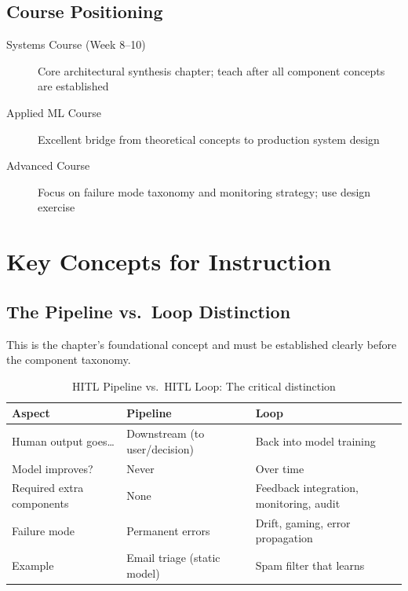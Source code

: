 \subsection{Course Positioning}
\begin{description}
    \item[Systems Course (Week 8--10)] Core architectural synthesis chapter; teach after all component concepts are established
    \item[Applied ML Course] Excellent bridge from theoretical concepts to production system design
    \item[Advanced Course] Focus on failure mode taxonomy and monitoring strategy; use design exercise
\end{description}

\section{Key Concepts for Instruction}

\subsection{The Pipeline vs.\ Loop Distinction}

This is the chapter's foundational concept and must be established clearly before the component taxonomy.

\begin{table}[htbp]
\caption{HITL Pipeline vs.\ HITL Loop: The critical distinction}
\label{tab:pipeline-vs-loop}
\centering
\begin{tabular}{@{}p{3.5cm}p{4cm}p{4cm}@{}}
\toprule
\textbf{Aspect} & \textbf{Pipeline} & \textbf{Loop} \\
\midrule
Human output goes\ldots & Downstream (to user/decision) & Back into model training \\
Model improves? & Never & Over time \\
Required extra components & None & Feedback integration, monitoring, audit \\
Failure mode & Permanent errors & Drift, gaming, error propagation \\
Example & Email triage (static model) & Spam filter that learns \\
\bottomrule
\end{tabular}
\end{table}

